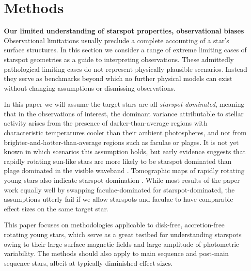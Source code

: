 \documentclass[revtex4]{emulateapj}%
\begin{document}
\section{Methods}\label{sec:methods}

\textbf{Our limited understanding of starspot properties, observational biases}
Observational limitations usually preclude a complete accounting of a star's surface structures.  In this section we consider a range of extreme limiting cases of starspot geometries as a guide to interpreting observations.  These admittedly pathological limiting cases do not represent physically plausible scenarios.  Instead they serve as benchmarks beyond which no further physical models can exist without changing assumptions or dismissing observations.

In this paper we will assume the target stars are all \emph{starspot dominated}, meaning that in the observations of interest, the dominant variance attributable to stellar activity arises from the presence of darker-than-average regions with characteristic temperatures cooler than their ambient photospheres, and not from brighter-and-hotter-than-average regions such as faculae or plages.  It is not yet known in which scenarios this assumption holds, but early evidence suggests that rapidly rotating sun-like stars are more likely to be starspot dominated than plage dominated in the visible waveband \citep{2017ApJ...851..116M}.  Tomographic maps of rapidly rotating young stars also indicate starspot domination \citep{donati14}.  While most results of the paper work equally well by swapping faculae-dominated for starspot-dominated, the assumptions utterly fail if we allow starspots and faculae to have comparable effect sizes on the same target star.

This paper focuses on methodologies applicable to disk-free, accretion-free rotating young stars, which serve as a great testbed for understanding starspots owing to their large surface magnetic fields and large amplitude of photometric variability.  The methods should also apply to main sequence and post-main sequence stars, albeit at typically diminished effect sizes.
\end{document}
